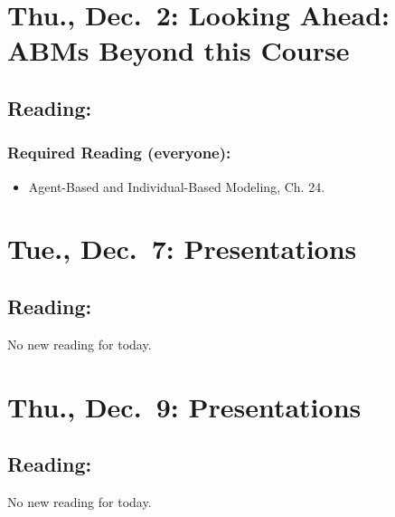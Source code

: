 \documentclass[
]{article}
\providecommand{\tightlist}{%
  \setlength{\itemsep}{0pt}\setlength{\parskip}{0pt}}
\begin{document}
\hypertarget{thu.-dec.-2-looking-ahead-abms-beyond-this-course}{%
\section{Thu., Dec.~2: Looking Ahead: ABMs Beyond this
Course}\label{thu.-dec.-2-looking-ahead-abms-beyond-this-course}}

\hypertarget{reading-25}{%
\subsection{Reading:}\label{reading-25}}

\hypertarget{required-reading-everyone-22}{%
\subsubsection{Required Reading
(everyone):}\label{required-reading-everyone-22}}

\begin{itemize}
\tightlist
\item
  Agent-Based and Individual-Based Modeling, Ch. 24.
\end{itemize}

\hypertarget{tue.-dec.-7-presentations}{%
\section{Tue., Dec.~7: Presentations}\label{tue.-dec.-7-presentations}}

\hypertarget{reading-26}{%
\subsection{Reading:}\label{reading-26}}

No new reading for today.

\hypertarget{thu.-dec.-9-presentations}{%
\section{Thu., Dec.~9: Presentations}\label{thu.-dec.-9-presentations}}

\hypertarget{reading-27}{%
\subsection{Reading:}\label{reading-27}}

No new reading for today.
\end{document}
